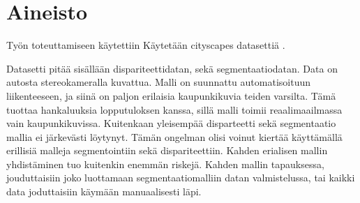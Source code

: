 \chapter{Aineisto}%
\label{ch:aineisto}

Työn toteuttamiseen käytettiin Käytetään cityscapes datasettiä \cite{Cordts2016Cityscapes}.


Datasetti pitää sisällään dispariteettidatan, sekä segmentaatiodatan.
Data on autosta stereokameralla kuvattua.
Malli on suunnattu automatisoituun liikenteeseen, ja siinä on paljon erilaisia kaupunkikuvia teiden varsilta.
Tämä tuottaa hankaluuksia lopputuloksen kanssa, sillä malli toimii reaalimaailmassa vain kaupunkikuvissa.
Kuitenkaan yleisempää disparteetti sekä segmentaatio mallia ei järkevästi löytynyt. 
Tämän ongelman olisi voinut kiertää käyttämällä erillisiä malleja segmentointiin sekä dispariteettiin. 
Kahden erialisen mallin yhdistäminen tuo kuitenkin enemmän riskejä.
Kahden mallin tapauksessa, jouduttaisiin joko luottamaan segmentaatiomalliin datan valmistelussa, 
tai kaikki data joduttaisiin käymään manuaalisesti läpi.
